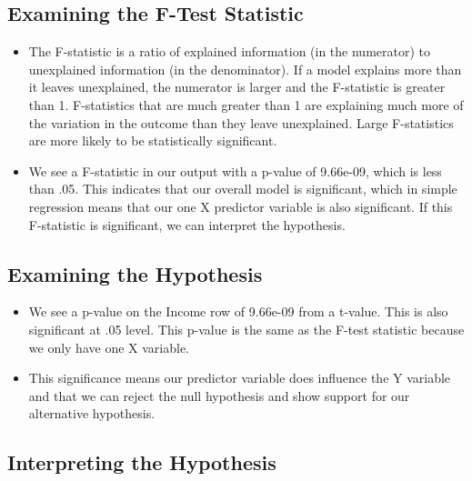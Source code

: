 \documentclass[
  letterpaper,
  DIV=11,
  numbers=noendperiod]{scrreprt}
\providecommand{\tightlist}{%
  \setlength{\itemsep}{0pt}\setlength{\parskip}{0pt}}\usepackage{longtable,booktabs,array}
\begin{document}
\subsection{Examining the F-Test
Statistic}\label{examining-the-f-test-statistic}

\begin{itemize}
\tightlist
\item
  The F-statistic is a ratio of explained information (in the numerator)
  to unexplained information (in the denominator). If a model explains
  more than it leaves unexplained, the numerator is larger and the
  F-statistic is greater than 1. F-statistics that are much greater than
  1 are explaining much more of the variation in the outcome than they
  leave unexplained. Large F-statistics are more likely to be
  statistically significant.
\item
  We see a F-statistic in our output with a p-value of 9.66e-09, which
  is less than .05. This indicates that our overall model is
  significant, which in simple regression means that our one X predictor
  variable is also significant. If this F-statistic is significant, we
  can interpret the hypothesis.
\end{itemize}

\subsection{Examining the Hypothesis}\label{examining-the-hypothesis}

\begin{itemize}
\tightlist
\item
  We see a p-value on the Income row of 9.66e-09 from a t-value. This is
  also significant at .05 level. This p-value is the same as the F-test
  statistic because we only have one X variable.
\item
  This significance means our predictor variable does influence the Y
  variable and that we can reject the null hypothesis and show support
  for our alternative hypothesis.
\end{itemize}

\subsection{Interpreting the
Hypothesis}\label{interpreting-the-hypothesis}
\end{document}
